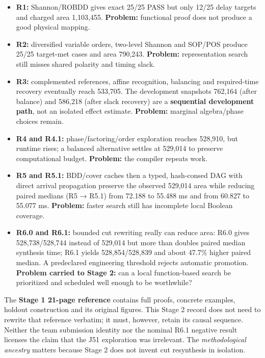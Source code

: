 \begin{itemize}
\tightlist
\item
  \textbf{R1:} Shannon/ROBDD gives exact 25/25 PASS but only 12/25 delay targets and charged area 1,103,455. \textbf{Problem:} functional proof does not produce a good physical mapping.
\item
  \textbf{R2:} diversified variable orders, two-level Shannon and SOP/POS produce 25/25 target-met cases and area 790,243. \textbf{Problem:} representation search still misses shared polarity and timing slack.
\item
  \textbf{R3:} complemented references, affine recognition, balancing and required-time recovery eventually reach 533,705. The development snapshots 762,164 (after balance) and 586,218 (after slack recovery) are a \textbf{sequential development path}, not an isolated effect estimate. \textbf{Problem:} marginal algebra/phase choices remain.
\item
  \textbf{R4 and R4.1:} phase/factoring/order exploration reaches 528,910, but runtime rises; a balanced alternative settles at 529,014 to preserve computational budget. \textbf{Problem:} the compiler repeats work.
\item
  \textbf{R5 and R5.1:} BDD/cover caches then a typed, hash-consed DAG with direct arrival propagation preserve the observed 529,014 area while reducing paired medians (R5 → R5.1) from 72.188 to 55.488 ms and from 60.827 to 55.077 ms. \textbf{Problem:} faster search still has incomplete local Boolean coverage.
\item
  \textbf{R6.0 and R6.1:} bounded cut rewriting really can reduce area: R6.0 gives 528,738/528,744 instead of 529,014 but more than doubles paired median synthesis time; R6.1 yields 528,854/528,839 and about 47.7\% higher paired median. A predeclared engineering threshold rejects automatic promotion. \textbf{Problem carried to Stage 2:} can a local function-based search be prioritized and scheduled well enough to be worthwhile?
\end{itemize}

The \textbf{Stage 1 21-page reference} contains full proofs, concrete examples, holdout construction and its original figures. This Stage 2 record does not need to rewrite that reference verbatim; it must, however, retain its causal sequence. Neither the team submission identity nor the nominal R6.1 negative result licenses the claim that the J51 exploration was irrelevant. The \emph{methodological ancestry} matters because Stage 2 does not invent cut resynthesis in isolation.

